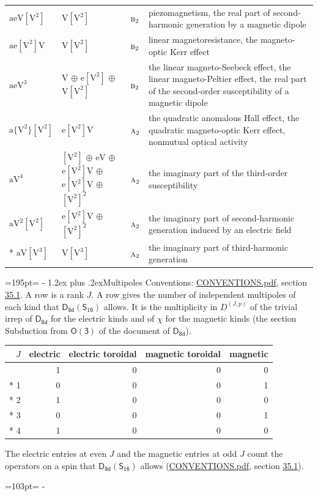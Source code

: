\documentclass[10pt,a4paper]{article}
\makeatletter
\renewcommand\section{\@startsection{section}{1}{\z@}{-3ex plus -1ex minus -.2ex}%
  {1.2ex plus .2ex}{\normalfont\large\sffamily\bfseries\color{parttitle}}}
\newcommand{\needspace}[1]{\par\penalty-100\begingroup\dimen0=#1\relax\dimen2=\pagegoal
  \advance\dimen2-\pagetotal\ifdim\dimen0>\dimen2\relax\ifdim\dimen2>0pt\vfil\break\fi\fi
  \endgroup}
\numberwithin{equation}{section}
\newcommand{\grp}[1]{\mathsf{#1}}
\newcommand{\irr}[1]{\text{\normalfont\scshape #1}}
\newcommand{\irrJp}[2]{D^{(#1,#2)}}
\newcommand{\jahn}[1]{\mathrm{#1}}
\newlength{\fillwidth}\newlength{\cellwidth}\newlength{\colwidth}
\makeatother
\begin{document}
{\begin{longtable}{@{}lll>{\RaggedRight\arraybackslash}p{\fillwidth}@{}}
$\jahn{aeV[V^{2}]}$ & $\jahn{V[V^{2}]}$ & $\irr{b}_{2}$ & piezomagnetism, the real part of second-harmonic generation by a magnetic dipole\\
$\jahn{ae[V^{2}]V}$ & $\jahn{V[V^{2}]}$ & $\irr{b}_{2}$ & linear magnetoresistance, the magneto-optic Kerr effect\\
$\jahn{aeV^{3}}$ & $\jahn{V}$ $\oplus$ $\jahn{e[V^{2}]}$ $\oplus$ $\jahn{V[V^{2}]}$ & $\irr{b}_{2}$ & the linear magneto-Seebeck effect, the linear magneto-Peltier effect, the real part of the second-order susceptibility of a magnetic dipole\\
$\jahn{a\{V^{2}\}[V^{2}]}$ & $\jahn{e[V^{2}]V}$ & $\irr{a}_{2}$ & the quadratic anomalous Hall effect, the quadratic magneto-optic Kerr effect, nonmutual optical activity\\
$\jahn{aV^{4}}$ & $\jahn{[V^{2}]}$ $\oplus$ $\jahn{eV}$ $\oplus$ $\jahn{e[V^{2}]V}$ $\oplus$ $\jahn{e[V^{2}]V}$ $\oplus$ $\jahn{[V^{2}]^{2}}$ & $\irr{a}_{2}$ & the imaginary part of the third-order susceptibility\\
$\jahn{aV^{2}[V^{2}]}$ & $\jahn{e[V^{2}]V}$ $\oplus$ $\jahn{[V^{2}]^{2}}$ & $\irr{a}_{2}$ & the imaginary part of second-harmonic generation induced by an electric field\\*
$\jahn{aV[V^{3}]}$ & $\jahn{V[V^{3}]}$ & $\irr{a}_{2}$ & the imaginary part of third-harmonic generation\\
\bottomrule\end{longtable}}
\needspace{195pt}
\section{Multipoles}\label{s:multipoles}
Conventions: \href{../../CONVENTIONS.pdf}{CONVENTIONS.pdf}, section \href{../../CONVENTIONS.pdf\#conv.35.1}{35.1}.
A row is a rank $J$. \label{n:head.multipole.electric}\label{n:head.multipole.electric.toroidal}\label{n:head.multipole.magnetic.toroidal}\label{n:head.multipole.magnetic}A row gives the number of independent multipoles of each kind that $\grp{D_{8d}}(\grp{S_{16}})$ allows. It is the multiplicity in $\irrJp{J}{p}$ of the trivial irrep of $\grp{D_{8d}}$ for the electric kinds and of $\chi$ for the magnetic kinds (the section Subduction from $\grp{O(3)}$ of the document of \href{../../../rotation/data/pdf/D8d.pdf}{$\grp{D_{8d}}$}).
{\small\begin{longtable}{@{}rrrrr@{}}\toprule
$J$ & electric & electric toroidal & magnetic toroidal & magnetic\\\midrule\endhead
\bottomrule\endfoot\endlastfoot
0 & 1 & 0 & 0 & 0\\*
1 & 0 & 0 & 0 & 1\\*
2 & 1 & 0 & 0 & 0\\*
3 & 0 & 0 & 0 & 1\\*
4 & 1 & 0 & 0 & 0\\
\bottomrule\end{longtable}}
The electric entries at even $J$ and the magnetic entries at odd $J$ count the operators on a spin that $\grp{D_{8d}}(\grp{S_{16}})$ allows (\href{../../CONVENTIONS.pdf}{CONVENTIONS.pdf}, section \href{../../CONVENTIONS.pdf\#conv.35.1}{35.1}).
\needspace{103pt}
\end{document}
